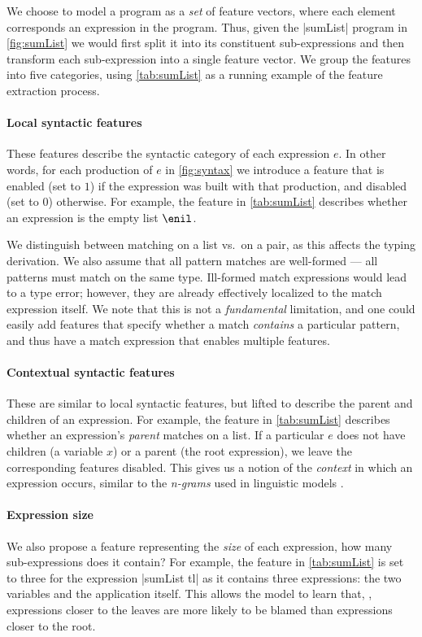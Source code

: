 We choose to model a program as a \emph{set} of feature vectors, where each
element corresponds an expression in the program. Thus, given the |sumList|
program in \autoref{fig:sumList} we would first split it into its constituent
sub-expressions and then transform each sub-expression into a single feature
vector. We group the features into five categories, using \autoref{tab:sumList}
as a running example of the feature extraction process.

\paragraph{Local syntactic features}
These features describe the syntactic category of each expression $e$. In other
words, for each production of $e$ in \autoref{fig:syntax} we introduce a feature
that is enabled (set to $1$) if the expression was built with that production,
and disabled (set to $0$) otherwise. For example, the \IsNil feature in
\autoref{tab:sumList} describes whether an expression is the empty list $\enil$.

We distinguish between matching on a list vs.\ on a pair, as this affects the
typing derivation. We also assume that all pattern matches are well-formed ---
\ie all patterns must match on the same type. Ill-formed match expressions would
lead to a type error; however, they are already effectively localized to the
match expression itself. We note that this is not a \emph{fundamental}
limitation, and one could easily add features that specify whether a match
\emph{contains} a particular pattern, and thus have a match expression that
enables multiple features.

\paragraph{Contextual syntactic features}
These are similar to local syntactic features, but lifted to describe the parent
and children of an expression. For example, the \IsCaseListP feature in
\autoref{tab:sumList} describes whether an expression's \emph{parent} matches on
a list. If a particular $e$ does not have children (\eg a variable $x$) or a
parent (\ie the root expression), we leave the corresponding features disabled.
This gives us a notion of the \emph{context} in which an expression occurs,
similar to the \emph{n-grams} used in linguistic models
\citep{Hindle2012-hf,Gabel2010-el}.

\paragraph{Expression size}
We also propose a feature representing the \emph{size} of each expression, \ie
how many sub-expressions does it contain? For example, the \ExprSize feature in
\autoref{tab:sumList} is set to three for the expression |sumList tl| as it
contains three expressions: the two variables and the application itself. This
allows the model to learn that, \eg, expressions closer to the leaves are more
likely to be blamed than expressions closer to the root.

